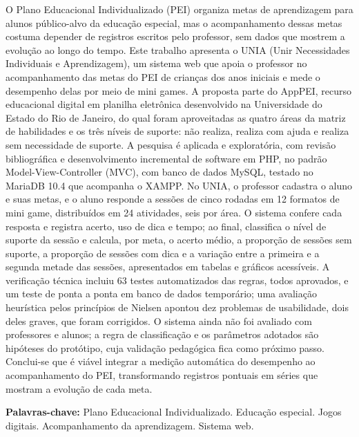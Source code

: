 
\noindent O Plano Educacional Individualizado (PEI) organiza metas de aprendizagem para alunos público-alvo da educação especial, mas o acompanhamento dessas metas costuma depender de registros escritos pelo professor, sem dados que mostrem a evolução ao longo do tempo. Este trabalho apresenta o UNIA (Unir Necessidades Individuais e Aprendizagem), um sistema web que apoia o professor no acompanhamento das metas do PEI de crianças dos anos iniciais e mede o desempenho delas por meio de mini games. A proposta parte do AppPEI, recurso educacional digital em planilha eletrônica desenvolvido na Universidade do Estado do Rio de Janeiro, do qual foram aproveitadas as quatro áreas da matriz de habilidades e os três níveis de suporte: não realiza, realiza com ajuda e realiza sem necessidade de suporte. A pesquisa é aplicada e exploratória, com revisão bibliográfica e desenvolvimento incremental de software em PHP, no padrão Model-View-Controller (MVC), com banco de dados MySQL, testado no MariaDB 10.4 que acompanha o XAMPP. No UNIA, o professor cadastra o aluno e suas metas, e o aluno responde a sessões de cinco rodadas em 12 formatos de mini game, distribuídos em 24 atividades, seis por área. O sistema confere cada resposta e registra acerto, uso de dica e tempo; ao final, classifica o nível de suporte da sessão e calcula, por meta, o acerto médio, a proporção de sessões sem suporte, a proporção de sessões com dica e a variação entre a primeira e a segunda metade das sessões, apresentados em tabelas e gráficos acessíveis. A verificação técnica incluiu 63 testes automatizados das regras, todos aprovados, e um teste de ponta a ponta em banco de dados temporário; uma avaliação heurística pelos princípios de Nielsen apontou dez problemas de usabilidade, dois deles graves, que foram corrigidos. O sistema ainda não foi avaliado com professores e alunos; a regra de classificação e os parâmetros adotados são hipóteses do protótipo, cuja validação pedagógica fica como próximo passo. Conclui-se que é viável integrar a medição automática do desempenho ao acompanhamento do PEI, transformando registros pontuais em séries que mostram a evolução de cada meta.

\vspace{\baselineskip}
\noindent\textbf{Palavras-chave:} Plano Educacional Individualizado. Educação especial. Jogos digitais. Acompanhamento da aprendizagem. Sistema web.
